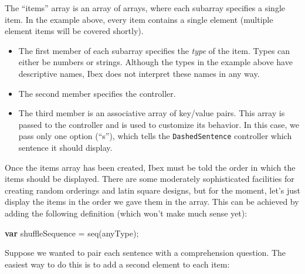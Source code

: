\documentclass[]{article}
\newenvironment{Shaded}{}{}
\newcommand{\KeywordTok}[1]{\textcolor[rgb]{0.00,0.44,0.13}{\textbf{{#1}}}}
\newcommand{\FunctionTok}[1]{\textcolor[rgb]{0.02,0.16,0.49}{{#1}}}
\newcommand{\NormalTok}[1]{{#1}}
\begin{document}
The ``items'' array is an array of arrays, where each subarray specifies
a single item. In the example above, every item contains a single
element (multiple element items will be covered shortly).

\begin{itemize}
\item
  The first member of each subarray specifies the \emph{type} of the
  item. Types can either be numbers or strings. Although the types in
  the example above have descriptive names, Ibex does not interpret
  these names in any way.
\item
  The second member specifies the controller.
\item
  The third member is an associative array of key/value pairs. This
  array is passed to the controller and is used to customize its
  behavior. In this case, we pass only one option (``s''), which tells
  the \texttt{DashedSentence} controller which sentence it should
  display.
\end{itemize}

Once the items array has been created, Ibex must be told the order in
which the items should be displayed. There are some moderately
sophisticated facilities for creating random orderings and latin square
designs, but for the moment, let's just display the items in the order
we gave them in the array. This can be achieved by adding the following
definition (which won't make much sense yet):

\begin{Shaded}
\begin{Highlighting}[]
    \KeywordTok{var} \NormalTok{shuffleSequence = }\FunctionTok{seq}\NormalTok{(anyType);}
\end{Highlighting}
\end{Shaded}

Suppose we wanted to pair each sentence with a comprehension question.
The easiest way to do this is to add a second element to each item:
\end{document}
